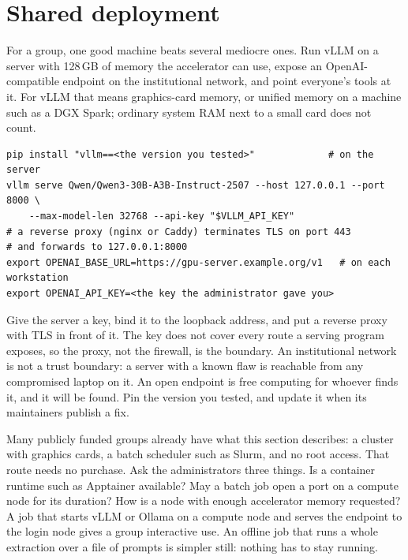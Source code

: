 \section{Shared deployment}

For a group, one good machine beats several mediocre ones. Run vLLM on a
server with 128\,GB of memory the accelerator can use, expose an
OpenAI-compatible endpoint on the institutional network, and point everyone's
tools at it. For vLLM that means graphics-card memory, or unified memory on a
machine such as a DGX Spark; ordinary system RAM next to a small card does not
count.

\begin{lstlisting}[style=shell,caption={Minimal shared serving}]
pip install "vllm==<the version you tested>"             # on the server
vllm serve Qwen/Qwen3-30B-A3B-Instruct-2507 --host 127.0.0.1 --port 8000 \
    --max-model-len 32768 --api-key "$VLLM_API_KEY"
# a reverse proxy (nginx or Caddy) terminates TLS on port 443
# and forwards to 127.0.0.1:8000
export OPENAI_BASE_URL=https://gpu-server.example.org/v1   # on each workstation
export OPENAI_API_KEY=<the key the administrator gave you>
\end{lstlisting}

Give the server a key, bind it to the loopback address, and put a reverse
proxy with TLS in front of it. The key does not cover every route a serving
program exposes, so the proxy, not the firewall, is the boundary. An
institutional network is not a trust boundary: a server with a known flaw is
reachable from any compromised laptop on it. An open endpoint is free
computing for whoever finds it, and it will be found. Pin the
version you tested, and update it when its maintainers publish a fix.

Many publicly funded groups already have what this section describes: a
cluster with graphics cards, a batch scheduler such as Slurm, and no root
access. That route needs no purchase. Ask the administrators three things. Is
a container runtime such as Apptainer available? May a batch job open a port
on a compute node for its duration? How is a node with enough accelerator
memory requested? A job that starts vLLM or Ollama on a compute node and
serves the endpoint to the login node gives a group interactive use. An offline
job that runs a whole extraction over a file of prompts is simpler still:
nothing has to stay running.
